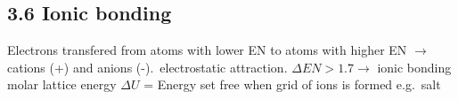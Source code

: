 \subsection{3.6 Ionic bonding}
    Electrons transfered from atoms with lower EN to atoms with higher EN $\rightarrow$ cations (+) and anions (-).\ electrostatic attraction. $\Delta EN > 1.7 \rightarrow$ ionic bonding\\
    molar lattice energy $\Delta U$ = Energy set free when grid of ions is formed e.g.\ salt